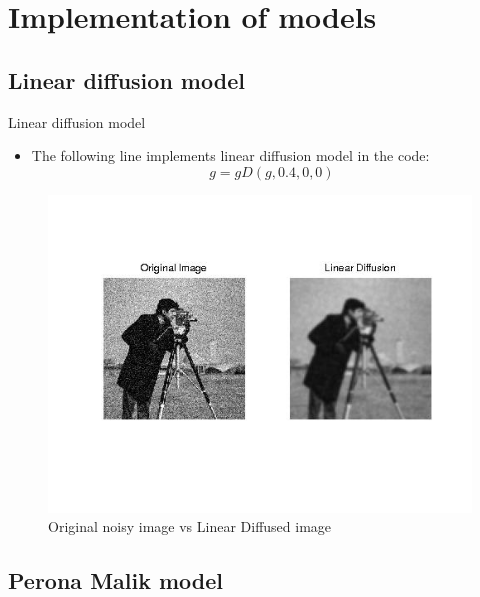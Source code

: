 \documentclass{beamer}
\begin{document}
\section{Implementation of models}

\subsection{Linear diffusion model}

\begin{frame}{Linear diffusion model}
    \begin{itemize}
    \item {The following line implements linear diffusion model in the code: \[g=gD(g,0.4,0,0)\]}
    \end{itemize}
\begin{figure}
\caption{Original noisy image vs Linear Diffused image}
\includegraphics[scale=0.5]{ld.jpg}
\end{figure}
\end{frame}

\subsection{Perona Malik model}
\end{document}

